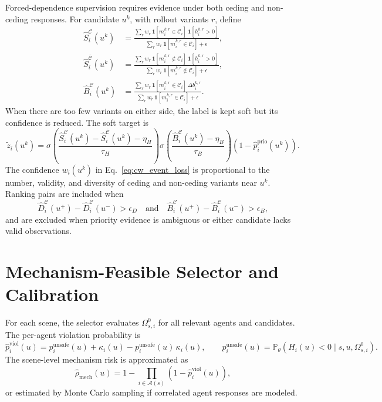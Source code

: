 \documentclass[10pt]{article}
\newcommand{\Prob}{\mathbb{P}}
\newcommand{\ind}{\mathbf{1}}
\newcommand{\cA}{\mathcal{A}}
\newcommand{\cC}{\mathcal{C}}
\begin{document}
Forced-dependence supervision requires evidence under both ceding and non-ceding responses. For candidate \(u^k\), with rollout variants \(r\), define
\begin{align}
    \widehat S_i^{\cC}(u^k)
    &=
    \frac{\sum_r w_r\,\ind[m_i^{k,r}\in\cC_i]\,\ind[h_i^{k,r}>0]}
    {\sum_r w_r\,\ind[m_i^{k,r}\in\cC_i]+\epsilon},\\
    \widehat S_i^{\bar{\cC}}(u^k)
    &=
    \frac{\sum_r w_r\,\ind[m_i^{k,r}\notin\cC_i]\,\ind[h_i^{k,r}>0]}
    {\sum_r w_r\,\ind[m_i^{k,r}\notin\cC_i]+\epsilon},\\
    \widehat B_i^{\cC}(u^k)
    &=
    \frac{\sum_r w_r\,\ind[m_i^{k,r}\in\cC_i]\,\Delta b_i^{k,r}}
    {\sum_r w_r\,\ind[m_i^{k,r}\in\cC_i]+\epsilon}.
\end{align}
When there are too few variants on either side, the label is kept soft but its confidence is reduced. The soft target is
\begin{equation}
    \tilde z_i(u^k)
    =
    \sigma
    \left(
    \frac{\widehat S_i^{\cC}(u^k)-\widehat S_i^{\bar{\cC}}(u^k)-\eta_H}{\tau_H}
    \right)
    \sigma
    \left(
    \frac{\widehat B_i^{\cC}(u^k)-\eta_B}{\tau_B}
    \right)
    \left(
    1-\widehat p_i^{\mathrm{prio}}(u^k)
    \right).
    \label{eq:appendix_soft_cw_label}
\end{equation}
The confidence \(w_i(u^k)\) in Eq.~\eqref{eq:cw_event_loss} is proportional to the number, validity, and diversity of ceding and non-ceding variants near \(u^k\). Ranking pairs are included when
\[
    \widehat D_i^{\cC}(u^+)-\widehat D_i^{\cC}(u^-)> \epsilon_D
    \quad\text{and}\quad
    \widehat B_i^{\cC}(u^+)-\widehat B_i^{\cC}(u^-)> \epsilon_B,
\]
and are excluded when priority evidence is ambiguous or either candidate lacks valid observations.

\section{Mechanism-Feasible Selector and Calibration}
\label{app:selector_calibration}

For each scene, the selector evaluates \(\Omega_{s,i}^{0}\) for all relevant agents and candidates. The per-agent violation probability is
\begin{equation}
    \hat p_i^{\mathrm{viol}}(u)
    =
    p_i^{\mathrm{unsafe}}(u)
    +
    \kappa_i(u)
    -
    p_i^{\mathrm{unsafe}}(u)\,\kappa_i(u),
    \qquad
    p_i^{\mathrm{unsafe}}(u)=
    \Prob_\theta(H_i(u)<0\mid s,u,\Omega_{s,i}^{0}).
    \label{eq:appendix_agent_violation}
\end{equation}
The scene-level mechanism risk is approximated as
\begin{equation}
    \hat\rho_{\mathrm{mech}}(u)
    =
    1-
    \prod_{i\in\cA(s)}
    \left(
    1-\hat p_i^{\mathrm{viol}}(u)
    \right),
    \label{eq:appendix_scene_violation}
\end{equation}
or estimated by Monte Carlo sampling if correlated agent responses are modeled.
\end{document}
